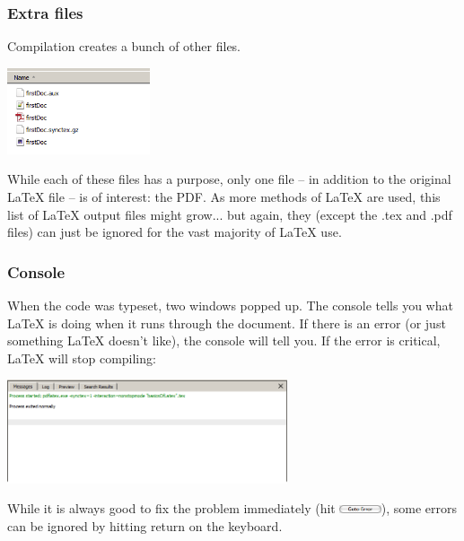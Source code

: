 \documentclass[slidestop,compress,mathserif]{beamer}
\begin{document}
\begin{frame} \frametitle{Extra files}
Compilation creates a bunch of other files.
\begin{center}
	\includegraphics[height=1.0in]{basicsOfLatex/gettingStarted/texstudioExtraFiles}
\end{center}

While each of these files has a purpose, only one file -- in addition to the original LaTeX file -- is of interest: the PDF. As more methods of LaTeX are used, this list of LaTeX output files might grow... but again, they (except the .tex and .pdf files) can just be ignored for the vast majority of LaTeX use.
\end{frame}

\begin{frame} \frametitle{Console}
When the code was typeset, two windows popped up. The {\color{highlight}console} tells you what LaTeX is doing when it runs through the document. If there is an error (or just something LaTeX doesn't like), the console will tell you. If the error is critical, LaTeX will stop compiling:
	\begin{center}
		\includegraphics[height=1.2in]{basicsOfLatex/gettingStarted/texstudioConsole}
	\end{center}
While it is always good to fix the problem immediately (hit \includegraphics[height=0.25cm]{basicsOfLatex/gettingStarted/gotoError}), some errors can be ignored by hitting {\color{highlight}return} on the keyboard.
\end{frame}
\end{document}
